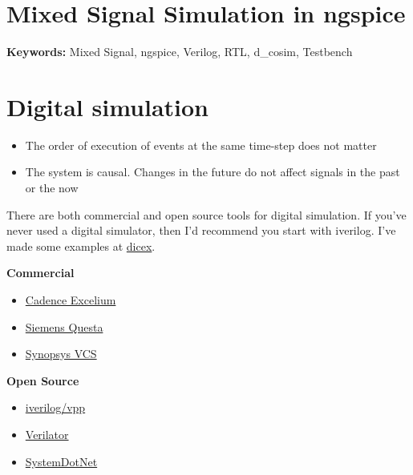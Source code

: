 \section{Mixed Signal Simulation in
ngspice}\label{mixed-signal-simulation-in-ngspice}

\textbf{Keywords:} Mixed Signal, ngspice, Verilog, RTL, d\_cosim,
Testbench

\section{Digital simulation}\label{digital-simulation}

\begin{itemize}
\item
  The order of execution of events at the same time-step does not matter
\item
  The system is causal. Changes in the future do not affect signals in
  the past or the now
\end{itemize}

There are both commercial and open source tools for digital simulation.
If you've never used a digital simulator, then I'd recommend you start
with iverilog. I've made some examples at
\href{https://github.com/wulffern/dicex/tree/main/project/verilog}{dicex}.

\textbf{Commercial}

\begin{itemize}
\tightlist
\item
  \href{https://www.cadence.com/ko_KR/home/tools/system-design-and-verification/simulation-and-testbench-verification/xcelium-simulator.html}{Cadence
  Excelium}
\item
  \href{https://eda.sw.siemens.com/en-US/ic/questa/simulation/advanced-simulator/}{Siemens
  Questa}
\item
  \href{https://www.synopsys.com/verification/simulation/vcs.html}{Synopsys
  VCS}
\end{itemize}

\textbf{Open Source}

\begin{itemize}
\tightlist
\item
  \href{https://github.com/steveicarus/iverilog}{iverilog/vpp}
\item
  \href{https://www.veripool.org/verilator/}{Verilator}
\item
  \href{https://sourceforge.net/projects/systemdotnet/}{SystemDotNet}
\end{itemize}

